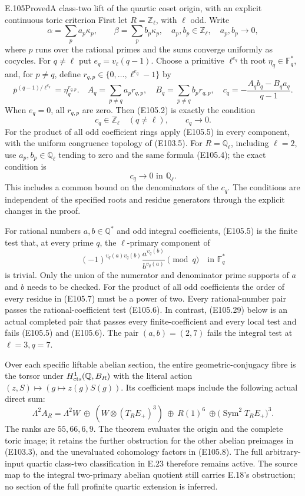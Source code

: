 \begin{statement}{E.105}{Proved}{A class-two lift of the quartic coset origin, with an explicit continuous toric criterion}
First let $R=\mathbb Z_\ell$, with $\ell$ odd.  Write
\[
 \alpha=\sum_p a_p\kappa_p,\qquad
 \beta=\sum_p b_p\kappa_p,
 \quad a_p,b_p\in\mathbb Z_\ell,\quad a_p,b_p\longrightarrow0,
 \tag{E105.3}
\]
where $p$ runs over the rational primes and the sums converge
uniformly as cocycles.  For $q\ne\ell$ put $e_q=v_\ell(q-1)$.
Choose a primitive $\ell^{e_q}$th root $\eta_q\in\mathbb F_q^*$,
and, for $p\ne q$, define $r_{q,p}\in\{0,\ldots,\ell^{e_q}-1\}$ by
\[
 \overline p^{(q-1)/\ell^{e_q}}=\eta_q^{r_{q,p}}.
 \quad
 A_q=\sum_{p\ne q}a_pr_{q,p},\quad
 B_q=\sum_{p\ne q}b_pr_{q,p},\quad
 c_q=-\frac{A_qb_q-B_qa_q}{q-1}.
 \tag{E105.4}
\]
When $e_q=0$, all $r_{q,p}$ are zero.
Then (E105.2) is exactly the condition
\[
          c_q\in\mathbb Z_\ell\quad(q\ne\ell),
                  \qquad c_q\longrightarrow0.
 \tag{E105.5}
\]
For the product of all odd coefficient rings apply (E105.5)
in every component, with the uniform congruence topology of
(E103.5).  For $R=\mathbb Q_\ell$, including $\ell=2$, use
$a_p,b_p\in\mathbb Q_\ell$ tending to zero and the same formula
(E105.4); the exact condition is
\[
                         c_q\longrightarrow0
                               \text{ in }\mathbb Q_\ell.
 \tag{E105.6}
\]
This includes a common bound on the denominators of the $c_q$.
The conditions are independent of the specified roots and
residue generators through the explicit changes in the proof.

For rational numbers $a,b\in\mathbb Q^*$ and odd integral
coefficients, (E105.5) is the finite test that, at every prime $q$,
the $\ell$-primary component of
\[
 (-1)^{v_q(a)v_q(b)}
       \frac{a^{v_q(b)}}{b^{v_q(a)}}\pmod q\quad\text{in }\mathbb F_q^*
 \tag{E105.7}
\]
is trivial.  Only the union of the numerator and denominator
prime supports of $a$ and $b$ needs to be checked.
For the product of all odd coefficients the order of every
residue in (E105.7) must be a power of two.
Every rational-number pair passes the rational-coefficient
test (E105.6).  In contrast, (E105.29) below is an actual
completed pair that passes every finite-coefficient and every
local test and fails (E105.5) and (E105.6).
The pair $(a,b)=(2,7)$ fails the integral test at $\ell=3,q=7$.

Over each specific liftable abelian section, the entire
geometric-conjugacy fibre is the torsor under
$H^1_{\rm cts}(\mathbb Q,B_R)$ with the literal action
$(z,S)\mapsto(g\mapsto z(g)S(g))$.
Its coefficient maps include the following actual direct sum:
\[
 \Lambda^2 A_R
  =\Lambda^2W\ \oplus\ (W\otimes(T_RE_+)^3)
       \ \oplus\ R(1)^6\ \oplus\bigl(\operatorname{Sym}^2T_RE_+\bigr)^3.
 \tag{E105.8}
\]
The ranks are $55,66,6,9$.
The theorem evaluates the origin and the complete toric image;
it retains the further obstruction for the other abelian
preimages in (E103.3), and the unevaluated cohomology factors
in (E105.8).  The full arbitrary-input quartic class-two
classification in E.23 therefore remains active.
The source map to the integral two-primary abelian quotient
still carries E.18's obstruction; no section of the full
profinite quartic extension is inferred.
\end{statement}
